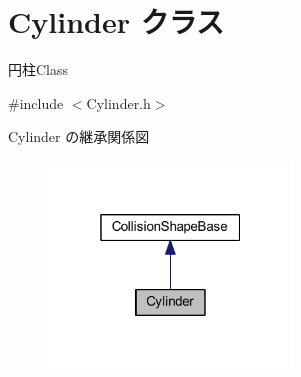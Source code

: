 \hypertarget{class_cylinder}{}\section{Cylinder クラス}
\label{class_cylinder}


円柱\+Class  




{\ttfamily \#include $<$Cylinder.\+h$>$}



Cylinder の継承関係図\nopagebreak
\begin{figure}[H]
\begin{center}
\leavevmode
\includegraphics[width=184pt]{class_cylinder__inherit__graph}
\end{center}
\end{figure}
